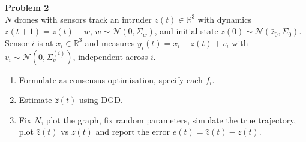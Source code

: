 \documentclass[a4paper, 11pt]{article}
\newenvironment{problem}[2][Problem]
    { \begin{mdframed}[backgroundcolor=gray!20] \textbf{#1 #2} \\}
    {  \end{mdframed}}
\begin{document}
\begin{problem}{2}
$N$ drones with sensors track an intruder $z(t) \in \mathbb{R}^3$ with dynamics $z(t+1) = z(t) + w$, $w \sim \mathcal{N}(0, \Sigma_w)$, and initial state $z(0) \sim \mathcal{N}(\bar z_0, \Sigma_0)$. Sensor $i$ is at $x_i \in \mathbb{R}^3$ and measures $y_i(t) = x_i - z(t) + v_i$ with $v_i \sim \mathcal{N}(0, \Sigma_v^{(i)})$, independent across $i$.
\begin{enumerate}[nosep]
    \item Formulate as consensus optimisation, specify each $f_i$.
    \item Estimate $\hat z(t)$ using DGD.
    \item Fix $N$, plot the graph, fix random parameters, simulate the true trajectory, plot $\hat z(t)$ vs $z(t)$ and report the error $e(t) = \hat z(t) - z(t)$.
\end{enumerate}
\end{problem}
\end{document}
